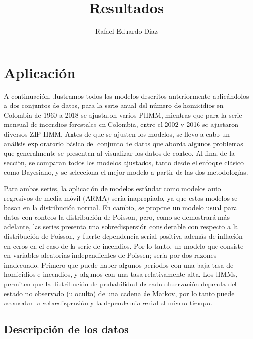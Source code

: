\documentclass[a4paper]{article}\usepackage[]{graphicx}\usepackage[]{color}
\title{Resultados} %
\author{Rafael Eduardo Diaz} %
\begin{document}
\maketitle
\section{Aplicación}

A continuación, ilustramos todos los modelos descritos anteriormente aplicándolos a dos conjuntos de datos, para la serie anual del número de homicidios en Colombia de 1960 a 2018 se ajustaron varios PHMM, mientras que para la serie mensual de incendios forestales en Colombia, entre el 2002 y 2016 se ajustaron diversos ZIP-HMM. Antes de que se ajusten los modelos, se llevo a cabo un análisis exploratorio básico del conjunto de datos que aborda algunos problemas que generalmente se presentan al visualizar los datos de conteo. Al final de la sección, se comparan todos los modelos ajustados, tanto desde el enfoque clásico como Bayesiano, y se selecciona el mejor modelo a partir de las dos metodologías. 

\vspace{5mm} %

Para ambas series, la aplicación de modelos estándar como modelos auto regresivos de media móvil (ARMA) sería inapropiado, ya que estos modelos se basan en la distribución normal. En cambio, se propone un modelo usual para datos con conteos la distribución de Poisson, pero, como se demostrará más adelante, las series presenta una sobredispersión considerable con respecto a la distribución de Poisson, y fuerte dependencia serial positiva además de inflación en ceros en el caso de la serie de incendios. Por lo tanto, un modelo que consiste en variables aleatorias independientes de Poisson; sería por dos razones inadecuado. Primero que puede haber algunos períodos con una baja tasa de homicidios e incendios, y algunos con una tasa relativamente alta. Los HMMs, permiten que la distribución de probabilidad de cada observación dependa del estado no observado (u oculto) de una cadena de Markov, por lo tanto puede acomodar la sobredispersión y la dependencia serial al mismo tiempo.



\subsection{Descripción de los datos}
\end{document}
